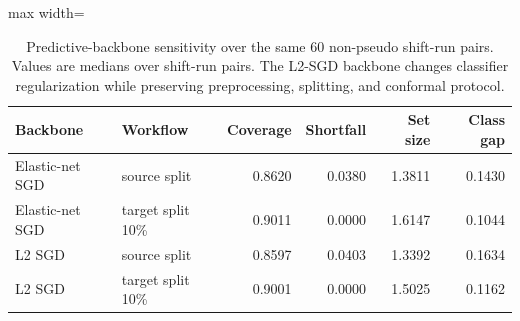 \begin{table}[!tbp]
\centering
\caption{Predictive-backbone sensitivity over the same 60 non-pseudo shift-run pairs. Values are medians over shift-run pairs. The L2-SGD backbone changes classifier regularization while preserving preprocessing, splitting, and conformal protocol.}
\label{tab:backbone_sensitivity}
\footnotesize
\setlength{\tabcolsep}{3pt}
\begin{adjustbox}{max width=\columnwidth}
\begin{tabular}{llrrrr}
\toprule
Backbone & Workflow & Coverage & Shortfall & Set size & Class gap \\
\midrule
Elastic-net SGD & source split & 0.8620 & 0.0380 & 1.3811 & 0.1430 \\
Elastic-net SGD & target split 10\% & 0.9011 & 0.0000 & 1.6147 & 0.1044 \\
L2 SGD & source split & 0.8597 & 0.0403 & 1.3392 & 0.1634 \\
L2 SGD & target split 10\% & 0.9001 & 0.0000 & 1.5025 & 0.1162 \\
\bottomrule
\end{tabular}
\end{adjustbox}
\end{table}
